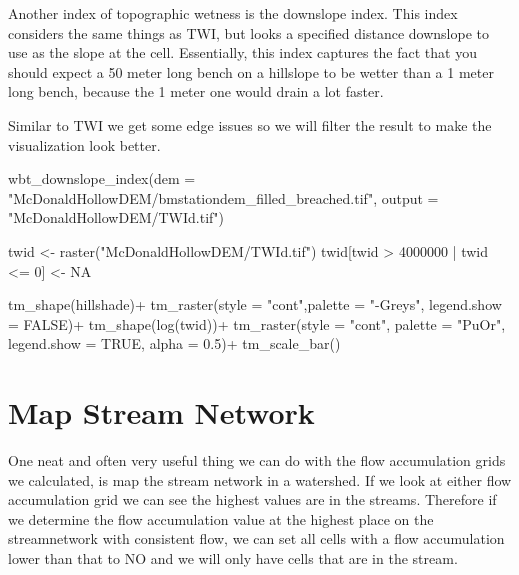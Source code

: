 \documentclass[
]{book}
\newenvironment{Shaded}{\begin{snugshade}}{\end{snugshade}}
\newcommand{\AttributeTok}[1]{\textcolor[rgb]{0.77,0.63,0.00}{#1}}
\newcommand{\ConstantTok}[1]{\textcolor[rgb]{0.00,0.00,0.00}{#1}}
\newcommand{\DecValTok}[1]{\textcolor[rgb]{0.00,0.00,0.81}{#1}}
\newcommand{\FloatTok}[1]{\textcolor[rgb]{0.00,0.00,0.81}{#1}}
\newcommand{\FunctionTok}[1]{\textcolor[rgb]{0.00,0.00,0.00}{#1}}
\newcommand{\NormalTok}[1]{#1}
\newcommand{\OtherTok}[1]{\textcolor[rgb]{0.56,0.35,0.01}{#1}}
\newcommand{\SpecialCharTok}[1]{\textcolor[rgb]{0.00,0.00,0.00}{#1}}
\newcommand{\StringTok}[1]{\textcolor[rgb]{0.31,0.60,0.02}{#1}}
\begin{document}
Another index of topographic wetness is the downslope index. This index considers the same things as TWI, but looks a specified distance downslope to use as the slope at the cell. Essentially, this index captures the fact that you should expect a 50 meter long bench on a hillslope to be wetter than a 1 meter long bench, because the 1 meter one would drain a lot faster.

Similar to TWI we get some edge issues so we will filter the result to make the visualization look better.

\begin{Shaded}
\begin{Highlighting}[]
\FunctionTok{wbt\_downslope\_index}\NormalTok{(}\AttributeTok{dem =} \StringTok{"McDonaldHollowDEM/bmstationdem\_filled\_breached.tif"}\NormalTok{,}
                    \AttributeTok{output =} \StringTok{"McDonaldHollowDEM/TWId.tif"}\NormalTok{)}

\NormalTok{twid }\OtherTok{\textless{}{-}} \FunctionTok{raster}\NormalTok{(}\StringTok{"McDonaldHollowDEM/TWId.tif"}\NormalTok{)}
\NormalTok{twid[twid }\SpecialCharTok{\textgreater{}} \DecValTok{4000000} \SpecialCharTok{|}\NormalTok{ twid }\SpecialCharTok{\textless{}=} \DecValTok{0}\NormalTok{] }\OtherTok{\textless{}{-}} \ConstantTok{NA}

\FunctionTok{tm\_shape}\NormalTok{(hillshade)}\SpecialCharTok{+}
  \FunctionTok{tm\_raster}\NormalTok{(}\AttributeTok{style =} \StringTok{"cont"}\NormalTok{,}\AttributeTok{palette =} \StringTok{"{-}Greys"}\NormalTok{, }\AttributeTok{legend.show =} \ConstantTok{FALSE}\NormalTok{)}\SpecialCharTok{+}
\FunctionTok{tm\_shape}\NormalTok{(}\FunctionTok{log}\NormalTok{(twid))}\SpecialCharTok{+}
  \FunctionTok{tm\_raster}\NormalTok{(}\AttributeTok{style =} \StringTok{"cont"}\NormalTok{, }\AttributeTok{palette =} \StringTok{"PuOr"}\NormalTok{, }\AttributeTok{legend.show =} \ConstantTok{TRUE}\NormalTok{, }\AttributeTok{alpha =} \FloatTok{0.5}\NormalTok{)}\SpecialCharTok{+}
  \FunctionTok{tm\_scale\_bar}\NormalTok{()}
\end{Highlighting}
\end{Shaded}

\hypertarget{map-stream-network}{%
\section{Map Stream Network}\label{map-stream-network}}

One neat and often very useful thing we can do with the flow accumulation grids we calculated, is map the stream network in a watershed. If we look at either flow accumulation grid we can see the highest values are in the streams. Therefore if we determine the flow accumulation value at the highest place on the streamnetwork with consistent flow, we can set all cells with a flow accumulation lower than that to NO and we will only have cells that are in the stream.
\end{document}
